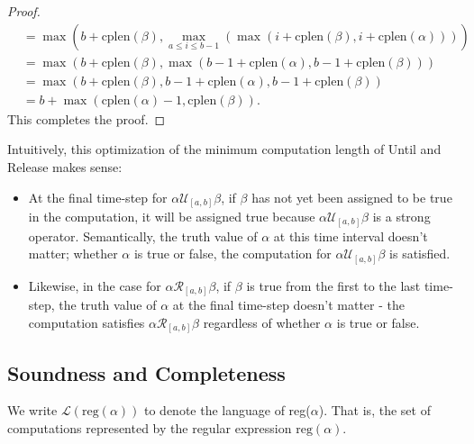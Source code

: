 \documentclass[runningheads]{llncs}
\begin{document}
\begin{proof}
\begin{align*}
     &= \max \left( b + \text{cplen}(\beta), \max_{a \leq i \leq b-1} \left(\max(i + \text{cplen}(\beta), i + \text{cplen}(\alpha))\right) \right)\\
     &= \max \left( b + \text{cplen}(\beta), \max(b-1+\text{cplen}(\alpha), b-1+\text{cplen}(\beta))\right)\\
     &= \max(b + \text{cplen}(\beta), b-1+\text{cplen}(\alpha), b-1+\text{cplen}(\beta))\\
     &= b + \max(\text{cplen}(\alpha)-1, \text{cplen}(\beta)).
 \end{align*}
 This completes the proof.
 \end{proof}
 
 \noindent Intuitively, this optimization of the minimum computation length of Until and Release makes sense:
 \begin{itemize}
     \item At the final time-step for $\alpha \mathcal{U}_{[a,b]} \beta$, if $\beta$ has not yet been assigned to be true in the computation, it will be assigned true because $\alpha \mathcal{U}_{[a,b]} \beta$ is a strong operator. Semantically, the truth value of $\alpha$ at this time interval doesn't matter; whether $\alpha$ is true or false, the computation for $\alpha \mathcal{U}_{[a,b]} \beta$ is satisfied.
     \item Likewise, in the case for $\alpha \mathcal{R}_{[a,b]} \beta$, if $\beta$ is true from the first to the last time-step, the truth value of $\alpha$ at the final time-step doesn't matter - the computation satisfies $\alpha \mathcal{R}_{[a,b]} \beta$ regardless of whether $\alpha$ is true or false.
 \end{itemize}
 
\subsection{Soundness and Completeness}
 We write $\mathscr{L}(\text{reg}(\alpha))$ to denote the language of reg($\alpha$). That is, the set of computations represented by the regular expression $\text{reg}(\alpha)$.
 
\end{document}
